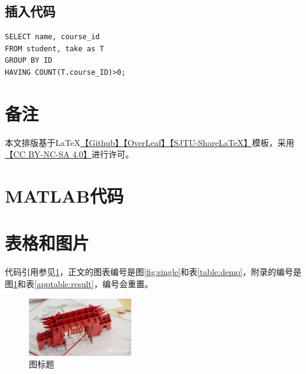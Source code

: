 \documentclass[a4paper]{article}
\begin{document}
\newpage
\subsection{插入代码}
\lstset{style=SQLStyle}
\begin{lstlisting}
SELECT name, course_id
FROM student, take as T
GROUP BY ID
HAVING COUNT(T.course_ID)>0;
\end{lstlisting}



\newpage
\section*{备注}
本文排版基于\LaTeX{}\href{https://github.com/JamesZhutheThird/A-Simple-LaTeX-Template}{【Github】}\href{https://cn.overleaf.com/read/mxmypkyfrzpz}{【OverLeaf】}\href{https://latex.sjtu.edu.cn/read/ndjrkpksrfzn}{【SJTU-ShareLaTeX】}模板，采用\href{http://creativecommons.org/licenses/by-nc-sa/4.0/}{【CC BY-NC-SA 4.0】}进行许可。





\appendix

\section{MATLAB代码}
\label{appcode:demo}


\section{表格和图片}
\setcounter{table}{0}   
\setcounter{figure}{0}
\renewcommand{\thetable}{B\arabic{table}}
\renewcommand{\thefigure}{B\arabic{figure}}

代码引用参见\ref{appcode:demo}，正文的图表编号是图\ref{fig:single}和表\ref{table:demo}，附录的编号是图\ref{appfig:single}和表\ref{apptable:result}，编号会重置。

\begin{figure}[!h]
	\centering
	\vspace{0cm}
	\includegraphics[width=0.4\textwidth,trim=50 100 200 75,clip]{figures/fig1.jpg}%
	\vspace{0cm}
	\caption{图标题}
	\label{appfig:single}
\end{figure}
\end{document}
